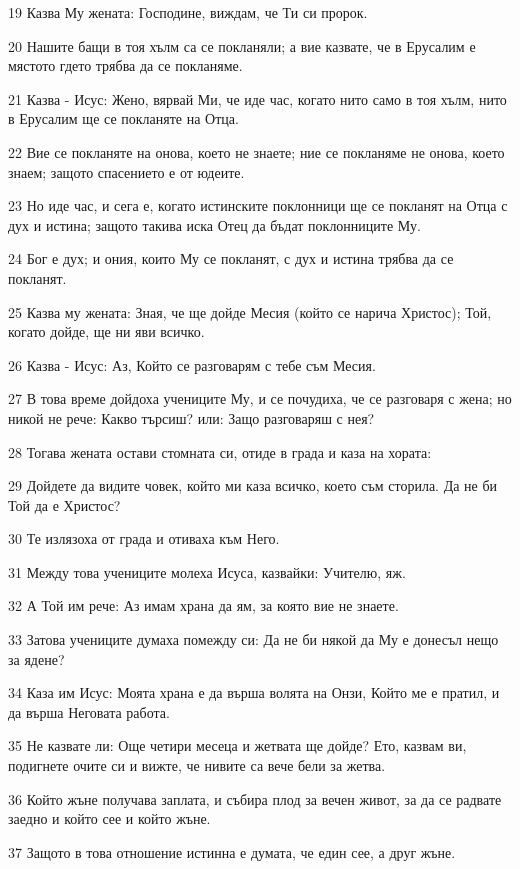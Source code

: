 \par 19 Казва Му жената: Господине, виждам, че Ти си пророк.
\par 20 Нашите бащи в тоя хълм са се покланяли; а вие казвате, че в Ерусалим е мястото гдето трябва да се покланяме.
\par 21 Казва - Исус: Жено, вярвай Ми, че иде час, когато нито само в тоя хълм, нито в Ерусалим ще се покланяте на Отца.
\par 22 Вие се покланяте на онова, което не знаете; ние се покланяме не онова, което знаем; защото спасението е от юдеите.
\par 23 Но иде час, и сега е, когато истинските поклонници ще се покланят на Отца с дух и истина; защото такива иска Отец да бъдат поклонниците Му.
\par 24 Бог е дух; и ония, които Му се покланят, с дух и истина трябва да се покланят.
\par 25 Казва му жената: Зная, че ще дойде Месия (който се нарича Христос); Той, когато дойде, ще ни яви всичко.
\par 26 Казва - Исус: Аз, Който се разговарям с тебе съм Месия.
\par 27 В това време дойдоха учениците Му, и се почудиха, че се разговаря с жена; но никой не рече: Какво търсиш? или: Защо разговаряш с нея?
\par 28 Тогава жената остави стомната си, отиде в града и каза на хората:
\par 29 Дойдете да видите човек, който ми каза всичко, което съм сторила. Да не би Той да е Христос?
\par 30 Те излязоха от града и отиваха към Него.
\par 31 Между това учениците молеха Исуса, казвайки: Учителю, яж.
\par 32 А Той им рече: Аз имам храна да ям, за която вие не знаете.
\par 33 Затова учениците думаха помежду си: Да не би някой да Му е донесъл нещо за ядене?
\par 34 Каза им Исус: Моята храна е да върша волята на Онзи, Който ме е пратил, и да върша Неговата работа.
\par 35 Не казвате ли: Още четири месеца и жетвата ще дойде? Ето, казвам ви, подигнете очите си и вижте, че нивите са вече бели за жетва.
\par 36 Който жъне получава заплата, и събира плод за вечен живот, за да се радвате заедно и който сее и който жъне.
\par 37 Защото в това отношение истинна е думата, че един сее, а друг жъне.
